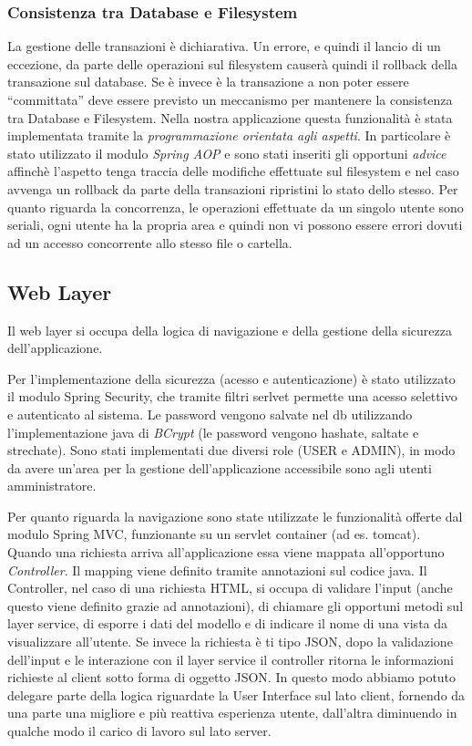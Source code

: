 \subsubsection{Consistenza tra Database e Filesystem}
La gestione delle transazioni è dichiarativa. Un errore, e quindi il
lancio di un eccezione, da parte delle operazioni sul filesystem
causerà quindi il rollback della transazione sul database. Se è invece
è la transazione a non poter essere ``committata'' deve essere
previsto un meccanismo per mantenere la consistenza tra Database e
Filesystem. Nella nostra applicazione questa funzionalità è stata
implementata tramite la \emph{programmazione orientata agli aspetti}.
In particolare è stato utilizzato il modulo \emph{Spring AOP} e sono
stati inseriti gli opportuni \emph{advice} affinchè l'aspetto tenga
traccia delle modifiche effettuate sul filesystem e nel caso avvenga
un rollback da parte della transazioni ripristini lo stato dello
stesso. Per quanto riguarda la concorrenza, le operazioni effettuate
da un singolo utente sono seriali, ogni utente ha la propria area e
quindi non vi possono essere errori dovuti ad un accesso concorrente
allo stesso file o cartella.

\subsection{Web Layer}

Il web layer si occupa della logica di navigazione e della
gestione della sicurezza dell'applicazione. 

Per l'implementazione della sicurezza (acesso e autenticazione) è
stato utilizzato il modulo Spring Security, che tramite filtri serlvet
permette una acesso selettivo e autenticato al sistema. Le password
vengono salvate nel db utilizzando l'implementazione java di
\emph{BCrypt} (le password vengono hashate, saltate e strechate). Sono
stati implementati due diversi role (USER e ADMIN), in modo da avere
un'area per la gestione dell'applicazione accessibile sono agli utenti
amministratore.


Per quanto riguarda la navigazione sono state utilizzate le
funzionalità offerte dal modulo Spring MVC, funzionante su un servlet
container (ad es. tomcat). Quando una richiesta arriva
all'applicazione essa viene mappata all'opportuno
\emph{Controller}. Il mapping viene definito tramite annotazioni sul
codice java. Il Controller, nel caso di una richiesta HTML, si occupa
di validare l'input (anche questo viene definito grazie ad
annotazioni), di chiamare gli opportuni metodi sul layer service, di
esporre i dati del modello e di indicare il nome di una vista da
visualizzare all'utente. Se invece la richiesta è ti tipo JSON, dopo
la validazione dell'input e le interazione con il layer service il
controller ritorna le informazioni richieste al client sotto forma di
oggetto JSON. In questo modo abbiamo potuto delegare parte della
logica riguardate la User Interface sul lato client, fornendo da una
parte una migliore e più reattiva esperienza utente, dall'altra
diminuendo in qualche modo il carico di lavoro sul lato server.

